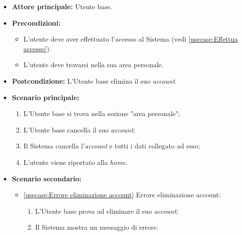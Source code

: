 \label{usecase:Eliminazione account}
\begin{itemize}
	\item \textbf{Attore principale:} Utente base.

	\item \textbf{Precondizioni:}
	\begin{itemize}
        \item L'utente deve aver effettuato l'accesso al Sistema (vedi \autoref{usecase:Effettua accesso}).
        \item L'utente deve trovarsi nella sua area personale.
    \end{itemize}

	\item \textbf{Postcondizione:} L'Utente base elimina il suo \textit{account}.

	\item \textbf{Scenario principale:}
	      \begin{enumerate}
		      \item L'Utente base si trova nella sezione "area personale";
		      \item L'Utente base cancella il suo \textit{account};
              \item Il Sistema cancella l'\textit{account} e tutti i dati collegato ad esso;
              \item L'utente viene riportato alla \textit{home}.
	      \end{enumerate}
	\item \textbf{Scenario secondario:}
		  \begin{itemize}
			  \item \autoref{usecase:Errore eliminazione account} Errore eliminazione account:
				\begin{enumerate}
					\item L'Utente base prova ad eliminare il suo \textit{account};
					\item Il Sistema mostra un messaggio di errore.
				\end{enumerate}
		  \end{itemize}
\end{itemize}
